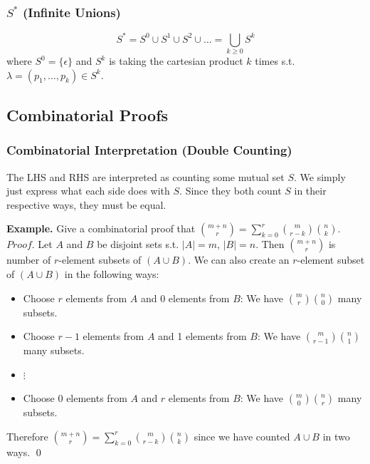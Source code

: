 \documentclass[11pt]{article}
\newenvironment{eg}[1]{
\begin{tcolorbox}[colback = white!15, arc=0pt,outer arc=0pt, colframe = black]
{\color{black} \textbf{Example.} #1} \\[5pt]
}
{
\end{tcolorbox}
}
\newcommand{\nl}{\\[5pt]}
\newcommand{\lstspacing}{\setlength\itemsep{1pt}}
\begin{document}
\subsubsection{$S^*$ (Infinite Unions)}
$$S^* = S^0 \cup S^1 \cup S^2 \cup \dots = \bigcup_{k\geq0} S^k$$
where $S^0 = \{\epsilon\}$ and $S^{k}$ is taking the cartesian product $k$ times s.t. $\lambda = (p_1, \dots, p_k) \in S^k$. 

\subsection{Combinatorial Proofs}

\subsubsection{Combinatorial Interpretation (Double Counting)}

The LHS and RHS are interpreted as counting some mutual set $S$. We simply just express what each side does with $S$. Since they both count $S$ in their respective ways, they must be equal. 
\begin{eg}{Give a combinatorial proof that $\binom{m+n}{r} = \sum_{k=0}^r \binom{m}{r-k}\binom{n}{k}$.}
$Proof.$ Let $A$ and $B$ be disjoint sets s.t. $|A| = m$, $|B| = n$. Then $\binom{m+n}{r}$ is number of $r$-element subsets of $(A \cup B)$. We can also create an $r$-element subset of $(A \cup B)$ in the following ways: 
\begin{itemize}
\lstspacing
    \item Choose $r$ elements from $A$ and 0 elements from $B$: We have $\binom{m}{r}\binom{n}{0}$ many subsets.
    \item {} 
Choose $r-1$ elements from $A$ and 1 elements from $B$: We have $\binom{m}{r-1}\binom{n}{1}$ many subsets.
    \item {} $\vdots$
    \item {} Choose 0 elements from $A$ and $r$ elements from $B$: We have $\binom{m}{0}\binom{n}{r}$ many subsets. 
\end{itemize}
Therefore $\binom{m+n}{r} = \sum_{k=0}^r \binom{m}{r-k}\binom{n}{k}$ since we have counted $A \cup B$ in two ways. \qed
\end{eg}

\end{document}
